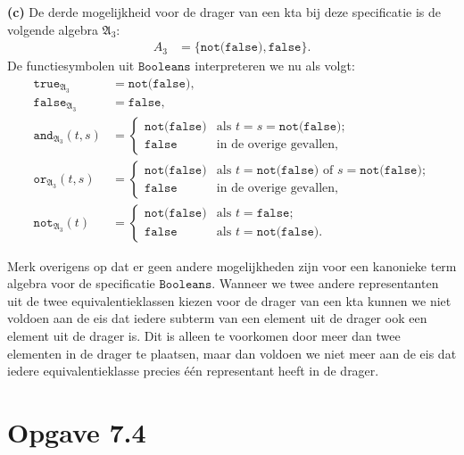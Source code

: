 \documentclass[a4paper,11pt]{article}
\begin{document}
\begin{description}
\item{\bf (c)} %
De derde mogelijkheid voor de drager van een kta bij deze
specificatie is de volgende algebra $\mathfrak{A}_{3}$:
\begin{align*}
A_{3} &= \{\texttt{not(false)}, \texttt{false}\}.
\end{align*}
De functiesymbolen uit $\texttt{Booleans}$ interpreteren we nu als volgt:
\begin{align*}
\texttt{true}_{\mathfrak{A}_{3}}     &= \texttt{not(false)}, \\
\texttt{false}_{\mathfrak{A}_{3}}    &= \texttt{false}, \\
\texttt{and}_{\mathfrak{A}_{3}}(t,s) &= \begin{cases}
  \texttt{not(false)} & \text{als $t = s = \texttt{not(false)}$;} \\
  \texttt{false}      & \text{in de overige gevallen,}
\end{cases} \\
\texttt{or}_{\mathfrak{A}_{3}}(t,s) &= \begin{cases}
  \texttt{not(false)} & \text{als $t = \texttt{not(false)}$ of $s = \texttt{not(false)}$;} \\
  \texttt{false}      & \text{in de overige gevallen,}
\end{cases} \\
\texttt{not}_{\mathfrak{A}_{3}}(t) &= \begin{cases}
  \texttt{not(false)} & \text{als $t = \texttt{false}$;} \\
  \texttt{false}      & \text{als $t = \texttt{not(false)}$.}
\end{cases}
\end{align*}

\end{description}

Merk overigens op dat er geen andere mogelijkheden zijn voor een kanonieke
term algebra voor de specificatie $\texttt{Booleans}$. Wanneer we twee andere
representanten uit de twee equivalentieklassen kiezen voor de drager van een
kta kunnen we niet voldoen aan de eis dat iedere subterm van een element uit
de drager ook een element uit de drager is.
Dit is alleen te voorkomen door meer dan twee elementen in de drager te
plaatsen, maar dan voldoen we niet meer aan de eis dat iedere
equivalentieklasse precies \'e\'en representant heeft in de drager.


\section*{Opgave 7.4}
\end{document}
